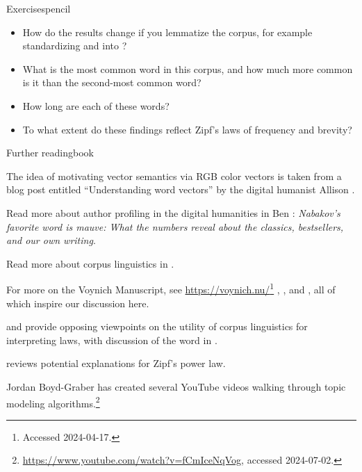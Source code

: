 \begin{tblsfilledsymbol}{Exercises}{pencil}
\begin{enumerate}
\begin{itemize}
\item How do the results change if you lemmatize the corpus, for example standardizing  and  into ?

\item What is the most common word in this corpus, and how much more common is it than the second-most common word?  

\item How long are each of these words?  

\item To what extent do these findings reflect  Zipf's laws of frequency and brevity?

\end{itemize}

\end{enumerate}
\end{tblsfilledsymbol}

\largerpage[3]

\begin{tblsfilledsymbol}{Further reading}{book}
    
The idea of motivating vector semantics via RGB color vectors is taken
from a blog post entitled ``Understanding word vectors'' by the
digital humanist Allison \citet{Parrish:2018}.

Read more about author profiling in the digital humanities in Ben
 \citet{Blatt:2017}: \textit{Nabakov's favorite word is mauve: What the
numbers reveal about the classics, bestsellers, and our own writing}.

Read more about corpus linguistics in  \citet{PaquotGries:2021}.

For more on the Voynich Manuscript, see \url{https://voynich.nu/}\footnote{Accessed 2024-04-17.} ,
\citet{ReddyKnight:2011}, and \citet{BowernLindemann:2021}, all of which
inspire our discussion here.

\citet{GriesSlocum:2017} and \citet{Hessick:2017} provide opposing
viewpoints on the utility of corpus linguistics for interpreting laws,
with discussion of the word  in .

\citet{Piantadosi:2014} reviews potential explanations for Zipf's power law.

Jordan Boyd-Graber has created several YouTube videos walking through
topic modeling algorithms.\footnote{\url{https://www.youtube.com/watch?v=fCmIceNqVog}, accessed 2024-07-02.}

\end{tblsfilledsymbol}
